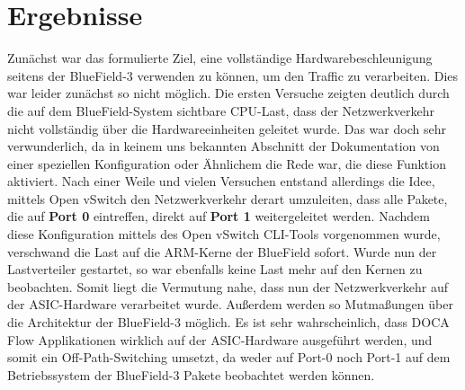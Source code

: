 \section{Ergebnisse}
Zunächst war das formulierte Ziel, eine vollständige Hardwarebeschleunigung seitens der BlueField-3 verwenden zu können, um den Traffic zu verarbeiten. Dies war leider zunächst so nicht möglich. Die ersten Versuche zeigten deutlich durch die auf dem BlueField-System sichtbare CPU-Last, dass der Netzwerkverkehr nicht vollständig über die Hardwareeinheiten geleitet wurde. Das war doch sehr verwunderlich, da in keinem uns bekannten Abschnitt der Dokumentation von einer speziellen Konfiguration oder Ähnlichem die Rede war, die diese Funktion aktiviert. Nach einer Weile und vielen Versuchen entstand allerdings die Idee, mittels Open vSwitch den Netzwerkverkehr derart umzuleiten, dass alle Pakete, die auf \textbf{Port 0} eintreffen, direkt auf \textbf{Port 1} weitergeleitet werden. Nachdem diese Konfiguration mittels des Open vSwitch CLI-Tools vorgenommen wurde, verschwand die Last auf die ARM-Kerne der BlueField sofort. Wurde nun der Lastverteiler gestartet, so war ebenfalls keine Last mehr auf den Kernen zu beobachten. Somit liegt die Vermutung nahe, dass nun der Netzwerkverkehr auf der ASIC-Hardware verarbeitet wurde. Außerdem werden so Mutmaßungen über die Architektur der BlueField-3 möglich. Es ist sehr wahrscheinlich, dass DOCA Flow Applikationen wirklich auf der ASIC-Hardware ausgeführt werden, und somit ein Off-Path-Switching umsetzt, da weder auf Port-0 noch Port-1 auf dem Betriebssystem der BlueField-3 Pakete beobachtet werden können. 
